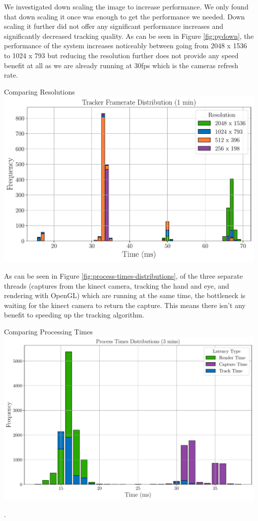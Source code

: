 We investigated down scaling the image to increase performance. We only found that down scaling it once was enough to get the performance we needed. Down scaling it further did not offer any significant performance increases and significantly decreased tracking quality. As can be seen in Figure \ref{fig:pydown}, the performance of the system increases noticeably between going from 2048 x 1536 to 1024 x 793 but reducing the resolution further does not provide any speed benefit at all as we are already running at 30fps which is the cameras refresh rate.

\begin{figureBox}[label={fig:pydown}, width=1.0\linewidth]{Comparing Resolutions}
	\includegraphics[width = 1.0\linewidth]{./evaluation/figures/pydown.pdf}
\end{figureBox}

As can be seen in Figure \ref{fig:process-times-distributions}, of the three separate threads (captures from the kinect camera, tracking the hand and eye, and rendering with OpenGL) which are running at the same time, the bottleneck is waiting for the kinect camera to return the capture. This means there isn't any benefit to speeding up the tracking algorithm.

\begin{figureBox}[label={fig:process-times-distributions}, width=1.0\linewidth]{Comparing Processing Times}
	\includegraphics[width = 1.0\linewidth]{./evaluation/figures/process-times-distributions.pdf}
\end{figureBox}.

